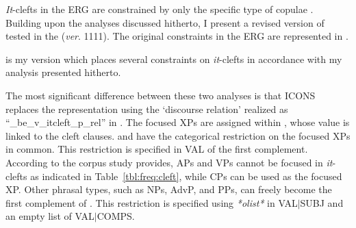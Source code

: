 \textit{It}-clefts in the ERG are constrained by only the specific
type of copulae . Building upon the
analyses discussed hitherto, I present a revised version of
 tested in the  (\textit{ver}. 1111).  The
original constraints in the ERG are represented in
.



 is my version which places several constraints on
\textit{it}-clefts in accordance with my analysis presented hitherto.




\noindent The most significant difference between these two analyses
is that ICONS replaces the representation using the `discourse
relation' realized as ``\_be\_v\_itcleft\_p\_rel'' in
. The focused XPs are assigned
 within , whose  value is
linked to the cleft clauses.   and
 have the categorical restriction on the focused
XPs in common. This restriction is specified in VAL of the first
complement.  According to the corpus study \citet{kim:07} provides,
APs and VPs cannot be focused in \textit{it}-clefts as indicated in
Table~\ref{tbl:freq:cleft}, while CPs can be used as the focused XP.
Other phrasal types, such as NPs, AdvP, and PPs, can freely become the
first complement of . This restriction is specified
using \textit{*olist*} in \mbox{VAL{$\mid$}SUBJ} and an empty list of
\mbox{VAL{$\mid$}COMPS}.


